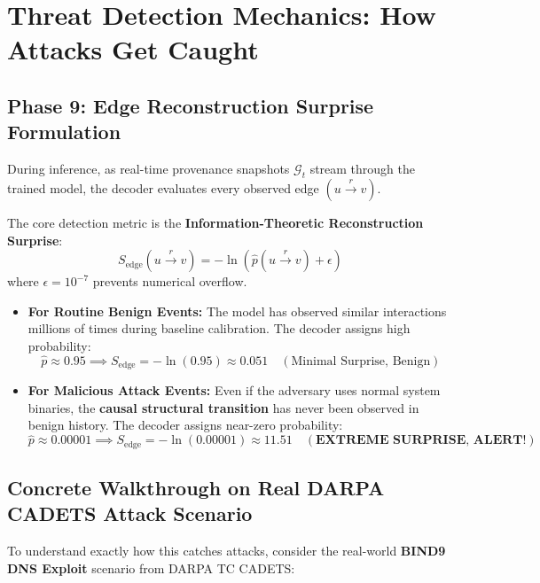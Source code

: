 \documentclass[11pt,a4paper]{report}
\begin{document}
\chapter{Threat Detection Mechanics: How Attacks Get Caught}

\section{Phase 9: Edge Reconstruction Surprise Formulation}
During inference, as real-time provenance snapshots $\mathcal{G}_t$ stream through the trained model, the decoder evaluates every observed edge $(u \xrightarrow{r} v)$.

The core detection metric is the \textbf{Information-Theoretic Reconstruction Surprise}:
$$S_{\text{edge}}(u \xrightarrow{r} v) = -\ln\left( \hat{p}(u \xrightarrow{r} v) + \epsilon \right)$$
where $\epsilon = 10^{-7}$ prevents numerical overflow.
\begin{itemize}
    \item \textbf{For Routine Benign Events:} The model has observed similar interactions millions of times during baseline calibration. The decoder assigns high probability:
    $$\hat{p} \approx 0.95 \implies S_{\text{edge}} = -\ln(0.95) \approx \mathbf{0.051} \quad (\text{Minimal Surprise, Benign})$$
    \item \textbf{For Malicious Attack Events:} Even if the adversary uses normal system binaries, the \textbf{causal structural transition} has never been observed in benign history. The decoder assigns near-zero probability:
    $$\hat{p} \approx 0.00001 \implies S_{\text{edge}} = -\ln(0.00001) \approx \mathbf{11.51} \quad (\textbf{EXTREME SURPRISE, ALERT!})$$
\end{itemize}

\section{Concrete Walkthrough on Real DARPA CADETS Attack Scenario}
To understand exactly how this catches attacks, consider the real-world \textbf{BIND9 DNS Exploit} scenario from DARPA TC CADETS:
\end{document}
